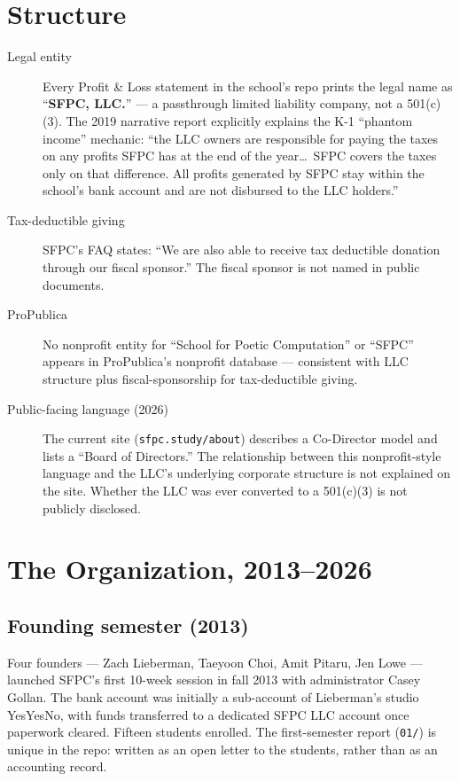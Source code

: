 \documentclass[10pt,letterpaper,twocolumn]{article}
\begin{document}
\section{Structure}

\begin{description}
\item[Legal entity] Every Profit \& Loss statement in the school's repo prints the legal name as ``\textbf{SFPC, LLC.}'' --- a passthrough limited liability company, not a 501(c)(3). The 2019 narrative report explicitly explains the K-1 ``phantom income'' mechanic: ``the LLC owners are responsible for paying the taxes on any profits SFPC has at the end of the year\ldots\ SFPC covers the taxes only on that difference. All profits generated by SFPC stay within the school's bank account and are not disbursed to the LLC holders.''~\citep{sfpc2019report}
\item[Tax-deductible giving] SFPC's FAQ states: ``We are also able to receive tax deductible donation through our fiscal sponsor.'' The fiscal sponsor is not named in public documents.
\item[ProPublica] No nonprofit entity for ``School for Poetic Computation'' or ``SFPC'' appears in ProPublica's nonprofit database --- consistent with LLC structure plus fiscal-sponsorship for tax-deductible giving.
\item[Public-facing language (2026)] The current site (\texttt{sfpc.study/about}) describes a Co-Director model and lists a ``Board of Directors.'' The relationship between this nonprofit-style language and the LLC's underlying corporate structure is not explained on the site. Whether the LLC was ever converted to a 501(c)(3) is not publicly disclosed.
\end{description}

\section{The Organization, 2013--2026}

\subsection{Founding semester (2013)}

Four founders --- Zach Lieberman, Taeyoon Choi, Amit Pitaru, Jen Lowe --- launched SFPC's first 10-week session in fall 2013 with administrator Casey Gollan. The bank account was initially a sub-account of Lieberman's studio YesYesNo, with funds transferred to a dedicated SFPC LLC account once paperwork cleared. Fifteen students enrolled. The first-semester report (\texttt{01/}) is unique in the repo: written as an open letter to the students, rather than as an accounting record.
\end{document}
